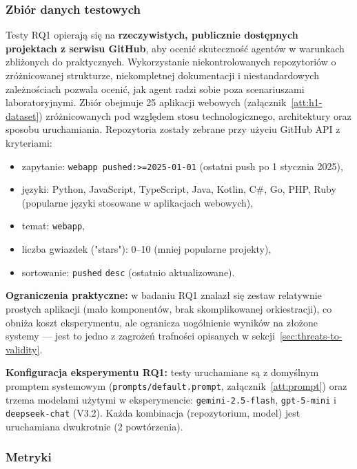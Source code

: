 \subsubsection{Zbiór danych testowych}

Testy RQ1 opierają się na \textbf{rzeczywistych, publicznie dostępnych projektach z serwisu GitHub}, aby ocenić skuteczność agentów w warunkach zbliżonych do praktycznych. Wykorzystanie niekontrolowanych repozytoriów o zróżnicowanej strukturze, niekompletnej dokumentacji i niestandardowych zależnościach pozwala ocenić, jak agent radzi sobie poza scenariuszami laboratoryjnymi. Zbiór obejmuje 25 aplikacji webowych (załącznik~\ref{att:h1-dataset}) zróżnicowanych pod względem stosu technologicznego, architektury oraz sposobu uruchamiania. Repozytoria zostały zebrane przy użyciu GitHub API z kryteriami:
\begin{itemize}
    \item zapytanie: \texttt{webapp pushed:>=2025-01-01} (ostatni push po 1 stycznia 2025),
    \item języki: Python, JavaScript, TypeScript, Java, Kotlin, C\#, Go, PHP, Ruby (popularne języki stosowane w aplikacjach webowych),
    \item temat: \texttt{webapp},
    \item liczba gwiazdek ("stars"): 0–10 (mniej popularne projekty),
    \item sortowanie: \texttt{pushed} \texttt{desc} (ostatnio aktualizowane).
\end{itemize}

\textbf{Ograniczenia praktyczne:} w badaniu RQ1 znalazł się zestaw relatywnie prostych aplikacji (mało komponentów, brak skomplikowanej orkiestracji), co obniża koszt eksperymentu, ale ogranicza uogólnienie wyników na złożone systemy — jest to jedno z zagrożeń trafności opisanych w sekcji~\ref{sec:threats-to-validity}.

\bigskip
\noindent
\textbf{Konfiguracja eksperymentu RQ1:} testy uruchamiane są z domyślnym promptem systemowym (\texttt{prompts/default.prompt}, załącznik~\ref{att:prompt}) oraz trzema modelami użytymi w eksperymencie: \texttt{gemini-2.5-flash}, \texttt{gpt-5-mini} i \texttt{deepseek-chat} (V3.2). Każda kombinacja (repozytorium, model) jest uruchamiana dwukrotnie (2 powtórzenia).

\subsubsection{Metryki}

